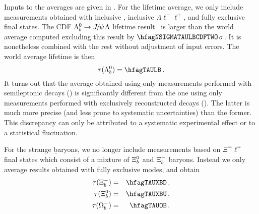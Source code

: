 Inputs to the averages are given in .
For the \Lb lifetime average, we only include measurements obtained
with inclusive , inclusive
$\Lambda \ell^- \ell^+$, and fully exclusive
final states.
The CDF $\Lambda_b^0 \to {J\mskip -3mu/\mskip -2mu\psi\mskip 2mu} \Lambda$
lifetime result~\cite{Aaltonen:2014wfa,*Aaltonen:2014wfa_cont} 
is larger than the world average computed excluding this result
by $\hfagNSIGMATAULBCDFTWO\,\sigma$. 
It is nonetheless combined with the rest 
without adjustment of input errors.
The world average \Lb lifetime is then
\begin{equation}
\tau(\Lb) = \hfagTAULB \,. 
\end{equation}
It turns out that the average obtained using only measurements performed 
with semileptonic \Lb decays (\hfagTAULBS) is significantly different 
from the one using only measurements performed with exclusively reconstructed 
\Lb decays (\hfagTAULBE). The latter is much more precise
(and less prone to systematic uncertainties) than the former. 
This discrepancy can only be attributed to a systematic experimental effect
or to a statistical fluctuation. 

For the strange \b baryons, we no longer include measurements based on
$\Xi^{\mp} \ell^{\mp}$~\cite{Buskulic:1996sm,Abdallah:2005cw,Abreu:1995kt} 
final states which consist of a mixture of 
$\Xi_b^0$ and $\Xi_b^-$ baryons. Instead we only average results obtained with 
fully exclusive modes, and obtain
\begin{eqnarray}
\tau(\Xibd) &=& \hfagTAUXBD \,, \\
\tau(\Xibu) &=& \hfagTAUXBU \,, \\
\tau(\Omegab) &=& \hfagTAUOB \,. 
\end{eqnarray}


